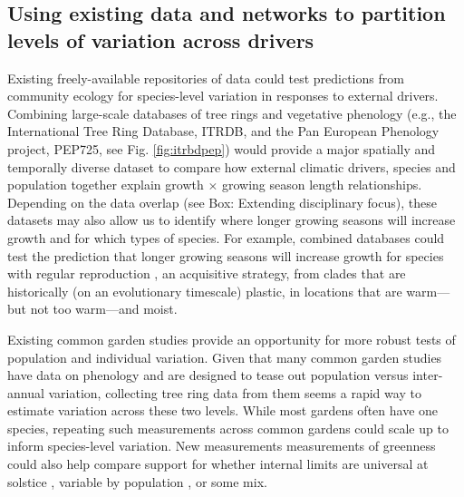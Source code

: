 \documentclass[11pt]{article}
\begin{document}
\subsection*{Using existing data and networks to partition levels of variation across drivers}

Existing freely-available repositories of data could test predictions from community ecology for species-level variation in responses to external drivers. Combining large-scale databases of tree rings and vegetative phenology (e.g., the International Tree Ring Database, ITRDB, and the Pan European Phenology project, PEP725, see Fig. \ref{fig:itrbdpep}) would provide a major spatially and temporally diverse dataset to compare how external climatic drivers, species and population together explain growth $\times$ growing season length relationships. Depending on the data overlap (see Box: Extending disciplinary focus), these datasets may also allow us to identify  where longer growing seasons will increase growth and for which types of species. For example, combined databases could test the prediction that longer growing seasons will increase growth for species with regular reproduction \citep[no masting, see also new masting database in][]{hacket2022mastree+}, an acquisitive strategy, from clades that are historically (on an evolutionary timescale) plastic, in locations that are warm---but not too warm---and moist. 

Existing common garden studies provide an opportunity for more robust tests of population and individual variation. Given that many common garden studies have data on phenology \citep{aitken2016} and are designed to tease out population versus inter-annual variation, collecting tree ring data from them seems a rapid way to estimate variation across these two levels. While most gardens often have one species, repeating such measurements across common gardens could scale up to inform species-level variation. New measurements measurements of greenness could also help compare support for whether internal limits are universal at solstice \citep{zohner2023effect}, variable by population \citep{soolanayakanahally2013timing}, or some mix.  %
\end{document}
